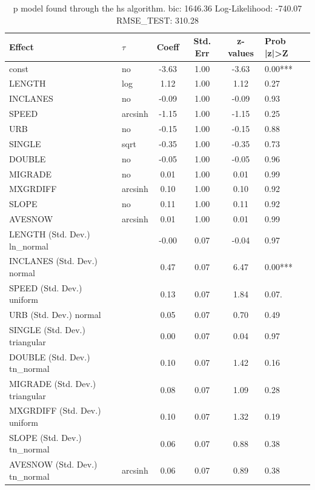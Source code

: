 \begin{table}
	\caption{p model found through the hs algorithm. bic: 1646.36 Log-Likelihood: -740.07 RMSE_TEST: 310.28}
	\begin{center}
		\begin{tabular}{|l|l|c|c|c|l|}
			\hline
			Effect & $\tau$ & Coeff & Std. Err & z-values & Prob |z|>Z \\
			\hline
			const & no & -3.63 & 1.00 & -3.63 & 0.00*** \\
			\hline
			LENGTH & log & 1.12 & 1.00 & 1.12 & 0.27 \\
			\hline
			INCLANES & no & -0.09 & 1.00 & -0.09 & 0.93 \\
			\hline
			SPEED & arcsinh & -1.15 & 1.00 & -1.15 & 0.25 \\
			\hline
			URB & no & -0.15 & 1.00 & -0.15 & 0.88 \\
			\hline
			SINGLE & sqrt & -0.35 & 1.00 & -0.35 & 0.73 \\
			\hline
			DOUBLE & no & -0.05 & 1.00 & -0.05 & 0.96 \\
			\hline
			MIGRADE & no & 0.01 & 1.00 & 0.01 & 0.99 \\
			\hline
			MXGRDIFF & arcsinh & 0.10 & 1.00 & 0.10 & 0.92 \\
			\hline
			SLOPE & no & 0.11 & 1.00 & 0.11 & 0.92 \\
			\hline
			AVESNOW & arcsinh & 0.01 & 1.00 & 0.01 & 0.99 \\
			\hline
			LENGTH (Std. Dev.) ln_normal &  & -0.00 & 0.07 & -0.04 & 0.97 \\
			\hline
			INCLANES (Std. Dev.) normal &  & 0.47 & 0.07 & 6.47 & 0.00*** \\
			\hline
			SPEED (Std. Dev.) uniform &  & 0.13 & 0.07 & 1.84 & 0.07. \\
			\hline
			URB (Std. Dev.) normal &  & 0.05 & 0.07 & 0.70 & 0.49 \\
			\hline
			SINGLE (Std. Dev.) triangular &  & 0.00 & 0.07 & 0.04 & 0.97 \\
			\hline
			DOUBLE (Std. Dev.) tn_normal &  & 0.10 & 0.07 & 1.42 & 0.16 \\
			\hline
			MIGRADE (Std. Dev.) triangular &  & 0.08 & 0.07 & 1.09 & 0.28 \\
			\hline
			MXGRDIFF (Std. Dev.) uniform &  & 0.10 & 0.07 & 1.32 & 0.19 \\
			\hline
			SLOPE (Std. Dev.) tn_normal &  & 0.06 & 0.07 & 0.88 & 0.38 \\
			\hline
			AVESNOW (Std. Dev.) tn_normal & arcsinh & 0.06 & 0.07 & 0.89 & 0.38 \\

\end{tabular}
\end{center}
\end{table}
